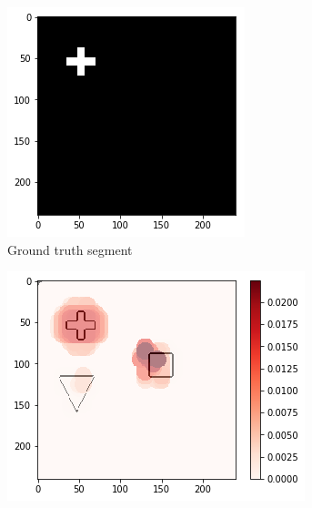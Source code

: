 \begin{figure}[H]
    \centering
    \begin{subfigure}[t]{.28\textwidth}
        \centering
        \includegraphics[width=\linewidth]{chapters/06_hdm/testnet/4.png}
        \caption{Ground truth segment}
    \end{subfigure}\hfill%
    \begin{subfigure}[t]{.34\textwidth}
        \centering
        \includegraphics[width=\linewidth]{chapters/06_hdm/testnet/6.png}

\end{subfigure}
\end{figure}
